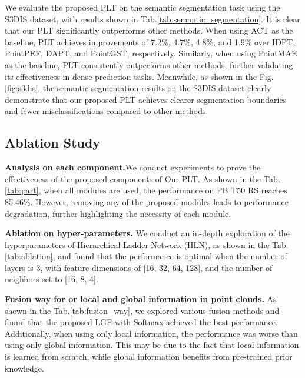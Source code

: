 We evaluate the proposed PLT on the semantic segmentation task using the S3DIS dataset\cite{armeni20163d}, with results shown in Tab.\ref{tab:semantic_segmentation}. It is clear that our PLT significantly outperforms other methods. When using ACT as the baseline, PLT achieves improvements of 7.2\%, 4.7\%, 4.8\%, and 1.9\% over IDPT, PointPEF, DAPT, and PointGST, respectively. Similarly, when using PointMAE as the baseline, PLT consistently outperforms other methods, further validating its effectiveness in dense prediction tasks. Meanwhile, as shown in the Fig.\ref{fig:s3dis}, the semantic segmentation results on the S3DIS dataset clearly demonstrate that our proposed PLT achieves clearer segmentation boundaries and fewer misclassifications compared to other methods.















\subsection{Ablation Study}

\textbf{Analysis on each component.}We conduct experiments to prove the effectiveness of the proposed components of Our PLT. As shown in the Tab.\ref{tab:part}, when all modules are used, the performance on PB T50 RS reaches 85.46\%. However, removing any of the proposed modules leads to performance degradation, further highlighting the necessity of each module.

\textbf{Ablation on hyper-parameters.} We conduct an in-depth exploration of the hyperparameters of Hierarchical Ladder Network (HLN), as shown in the Tab.\ref{tab:ablation}, and found that the performance is optimal when the number of layers is 3, with feature dimensions of [16, 32, 64, 128], and the number of neighbors set to [16, 8, 4].

\textbf{Fusion way for or local and global information in point clouds.} As shown in the Tab.\ref{tab:fusion_way}, we explored various fusion methods and found that the proposed LGF with Softmax achieved the best performance. Additionally, when using only local information, the performance was worse than using only global information. This may be due to the fact that local information is learned from scratch, while global information benefits from pre-trained prior knowledge.

